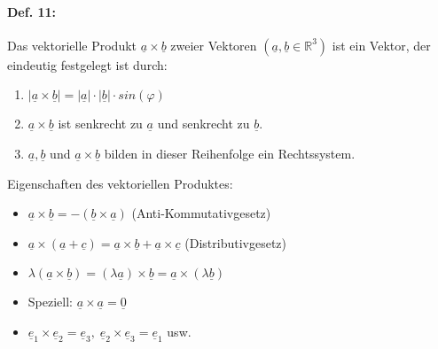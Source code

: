 \begin{enumerate}
\paragraph{Def. 11:} \parskp
Das vektorielle Produkt $\underline{a} \times \underline{b}$ zweier Vektoren $(\underline{a}, \underline{b} \in \mathbb{R}^3)$ ist ein Vektor, der eindeutig festgelegt ist durch:
\begin{enumerate}[label=(\arabic*)]
\item $|\underline{a} \times \underline{b}| = |\underline{a}| \cdot |\underline{b}| \cdot sin(\varphi)$
\item $\underline{a} \times \underline{b}$ ist senkrecht zu $\underline{a}$ und senkrecht zu $\underline{b}$.
\item $\underline{a}, \underline{b}$ und $\underline{a}\times \underline{b}$ bilden in dieser Reihenfolge ein Rechtssystem.
\end{enumerate}
Eigenschaften des vektoriellen Produktes:
\begin{itemize}
\item $\underline{a} \times \underline{b} = -(\underline{b}\times \underline{a})$ (Anti-Kommutativgesetz)
\item $\underline{a} \times (\underline{a} + \underline{c})=\underline{a} \times \underline{b} + \underline{a} \times \underline{c}$ (Distributivgesetz)
\item $\lambda (\underline{a} \times \underline{b} )= (\lambda \underline{a}) \times \underline{b}= \underline{a} \times (\lambda \underline{b})$
\item Speziell: $\underline{a} \times \underline{a} = \underline{0}$
\item $\underline{e}_1 \times \underline{e}_2= \underline{e}_3,\; \underline{e}_2\times \underline{e}_3=\underline{e}_1$ usw.
\end{itemize}


\end{enumerate}

